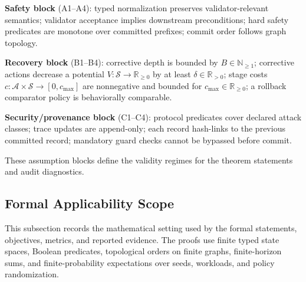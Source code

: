 \documentclass{article} %
\begin{document}
\textbf{Safety block} (A1--A4): typed normalization preserves validator-relevant semantics; validator acceptance implies downstream preconditions; hard safety predicates are monotone over committed prefixes; commit order follows graph topology.

\textbf{Recovery block} (B1--B4): corrective depth is bounded by $B\in\mathbb{N}_{\ge1}$; corrective actions decrease a potential $V:\mathcal{S}\to\mathbb{R}_{\ge0}$ by at least $\delta\in\mathbb{R}_{>0}$; stage costs $c:\mathcal{A}\times\mathcal{S}\to[0,c_{\max}]$ are nonnegative and bounded for $c_{\max}\in\mathbb{R}_{\ge0}$; a rollback comparator policy is behaviorally comparable.

\textbf{Security/provenance block} (C1--C4): protocol predicates cover declared attack classes; trace updates are append-only; each record hash-links to the previous committed record; mandatory guard checks cannot be bypassed before commit.

These assumption blocks define the validity regimes for the theorem statements and audit diagnostics.

\subsection{Formal Applicability Scope}
\label{sec:formal_scope}
This subsection records the mathematical setting used by the formal statements, objectives, metrics, and reported evidence. The proofs use finite typed state spaces, Boolean predicates, topological orders on finite graphs, finite-horizon sums, and finite-probability expectations over seeds, workloads, and policy randomization.
\end{document}
